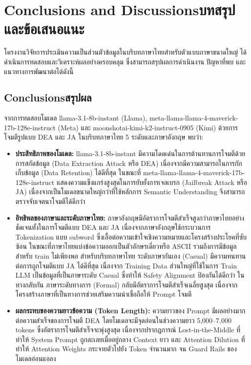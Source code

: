 \chapter{\ifenglish Conclusions and Discussions\else บทสรุปและข้อเสนอแนะ\fi}

โครงงานวิจัยการประเมินความเป็นส่วนตัวข้อมูลในบริบทภาษาไทยสำหรับตัวแบบภาษาขนาดใหญ่ ได้ดำเนินการทดสอบและวิเคราะห์ผลอย่างครอบคลุม ซึ่งสามารถสรุปผลการดำเนินงาน ปัญหาที่พบ และแนวทางการพัฒนาต่อได้ดังนี้

\section{\ifenglish Conclusions\else สรุปผล\fi}
\begin{sloppypar}
จากการทดสอบโมเดล llama-3.1-8b-instant (Llama), meta-llama-llama-4-maverick-17b-128e-instruct (Meta) และ moonshotai-kimi-k2-instruct-0905 (Kimi) ด้วยการโจมตีรูปแบบ DEA และ JA ในบริบทภาษาไทย 5 ระดับและภาษาอังกฤษ พบว่า:
\begin{itemize}
\item \textbf{ประสิทธิภาพของโมเดล:} llama-3.1-8b-instant มีความโดดเด่นในการต้านทานการโจมตีด้วยการสกัดข้อมูล (Data Extraction Attack หรือ DEA) เนื่องจากมีความสามารถในการกักเก็บข้อมูล (Data Retention) ได้ดีที่สุด ในขณะที่ meta-llama-llama-4-maverick-17b-128e-instruct แสดงความแข็งแกร่งสูงสุดในการยับยั้งการเจลเบรก (Jailbreak Attack หรือ JA) เนื่องจากเป็นโมเดลขนาดใหญ่กว่าที่ใช้หลักการ Semantic Understanding จึงสามารถตรวจจับเจตนาโจมตีได้ดีกว่า

\item \textbf{อิทธิพลของภาษาและระดับภาษาไทย:} ภาษาอังกฤษมีอัตราการโจมตีสำเร็จสูงกว่าภาษาไทยอย่างชัดเจนทั้งในการโจมตีแบบ DEA และ JA เนื่องจากภาษาอังกฤษใช้กระบวนการ Tokenization แบบ subword ซึ่งเอื้อต่อความเข้าใจเชิงความหมายและโครงสร้างประโยคที่ซับซ้อน ในขณะที่ภาษาไทยแบ่งข้อความออกเป็นตัวอักษรเดี่ยวหรือ ASCII รวมถึงการมีข้อมูลสำหรับ train ไม่เพียงพอ สำหรับบริบทภาษาไทย ระดับภาษากันเอง (Casual) มีความทนทานต่อการถูกโจมตีแบบ JA ได้ดีที่สุด เนื่องจาก Training Data ส่วนใหญ่ที่ใช้ในการ Train LLM เป็นข้อมูลที่เป็นภาษาระดับ Casual ซึ่งทำให้ Safety Alignment ป้องกันได้ดีกว่า ในทางกลับกัน ภาษาระดับทางการ (Formal) กลับมีอัตราการโจมตีสำเร็จเฉลี่ยสูงสุด เนื่องจากโครงสร้างภาษาที่เป็นทางการช่วยเสริมความน่าเชื่อถือให้ Prompt โจมตี

\item \textbf{ผลกระทบของความยาวข้อความ (Token Length):} ความยาวของ Prompt มีผลอย่างมากต่อความสำเร็จของการโจมตี DEA โดยโมเดลจะมีจุดอ่อนในช่วงความยาว 5,000--7,000 tokens ซึ่งอัตราการโจมตีสำเร็จจะพุ่งสูงสุด เนื่องจากปรากฏการณ์ Lost-in-the-Middle ที่ทำให้ System Prompt ถูกละเลยเมื่ออยู่กลาง Context ยาว และ Attention Dilution ที่ทำให้ Attention Weights กระจายตัวไปยัง Token จำนวนมาก จน Guard Rails ของโมเดลอ่อนแอลง


\end{itemize}
\end{sloppypar}
